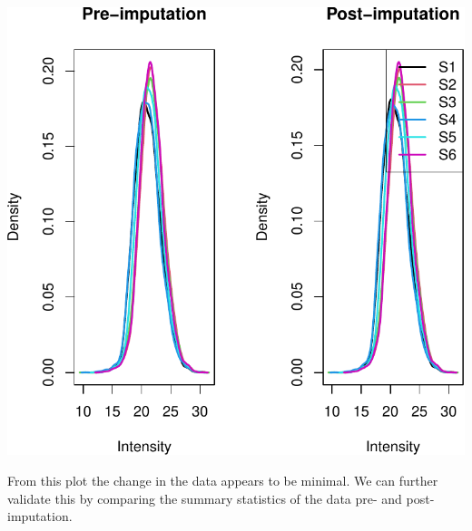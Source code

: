 \documentclass[9pt,a4paper,]{extarticle}
\begin{document}
\begin{center}\includegraphics[width=0.8\linewidth]{workflow_expressions_files/figure-latex/lfq_imputation_4-1} \end{center}

From this plot the change in the data appears to be minimal. We can further
validate this by comparing the summary statistics of the data pre- and post-
imputation.
\end{document}
